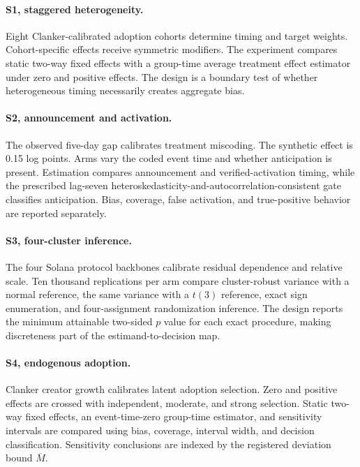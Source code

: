 \documentclass{article}
\begin{document}
\paragraph{S1, staggered heterogeneity.}
Eight Clanker-calibrated adoption cohorts determine timing and target weights. Cohort-specific effects receive symmetric modifiers. The experiment compares static two-way fixed effects with a group-time average treatment effect estimator under zero and positive effects. The design is a boundary test of whether heterogeneous timing necessarily creates aggregate bias.

\paragraph{S2, announcement and activation.}
The observed five-day gap calibrates treatment miscoding. The synthetic effect is 0.15 log points. Arms vary the coded event time and whether anticipation is present. Estimation compares announcement and verified-activation timing, while the prescribed lag-seven heteroskedasticity-and-autocorrelation-consistent gate classifies anticipation. Bias, coverage, false activation, and true-positive behavior are reported separately.

\paragraph{S3, four-cluster inference.}
The four Solana protocol backbones calibrate residual dependence and relative scale. Ten thousand replications per arm compare cluster-robust variance with a normal reference, the same variance with a $t(3)$ reference, exact sign enumeration, and four-assignment randomization inference. The design reports the minimum attainable two-sided $p$ value for each exact procedure, making discreteness part of the estimand-to-decision map.

\paragraph{S4, endogenous adoption.}
Clanker creator growth calibrates latent adoption selection. Zero and positive effects are crossed with independent, moderate, and strong selection. Static two-way fixed effects, an event-time-zero group-time estimator, and sensitivity intervals are compared using bias, coverage, interval width, and decision classification. Sensitivity conclusions are indexed by the registered deviation bound $\overline{M}$.
\end{document}
